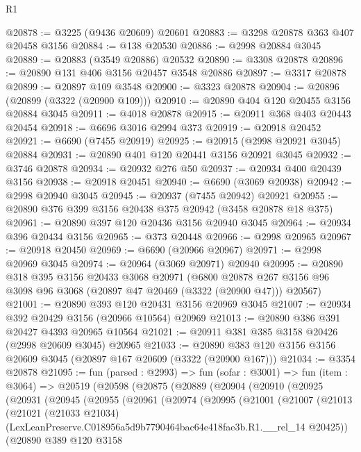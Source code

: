 \begin{lexlean}{R1}
\begin{coremodule}
@20878 := @3225 (@9436 @20609) @20601
@20883 := @3298 @20878 @363 @407 @20458 @3156
@20884 := @138 @20530
@20886 := @2998 @20884 @3045
@20889 := @20883 (@3549 @20886) @20532
@20890 := @3308 @20878
@20896 := @20890 @131 @406 @3156 @20457 @3548 @20886
@20897 := @3317 @20878
@20899 := @20897 @109 @3548
@20900 := @3323 @20878
@20904 := @20896 (@20899 (@3322 (@20900 @109)))
@20910 := @20890 @404 @120 @20455 @3156 @20884 @3045
@20911 := @4018 @20878
@20915 := @20911 @368 @403 @20443 @20454
@20918 := @6696 @3016 @2994 @373
@20919 := @20918 @20452
@20921 := @6690 (@7455 @20919)
@20925 := @20915 (@2998 @20921 @3045) @20884
@20931 := @20890 @401 @120 @20441 @3156 @20921 @3045
@20932 := @3746 @20878
@20934 := @20932 @276 @50
@20937 := @20934 @400 @20439 @3156
@20938 := @20918 @20451
@20940 := @6690 (@3069 @20938)
@20942 := @2998 @20940 @3045
@20945 := @20937 (@7455 @20942) @20921
@20955 := @20890 @376 @399 @3156 @20438 @375 @20942 (@3458 @20878 @18 @375)
@20961 := @20890 @397 @120 @20436 @3156 @20940 @3045
@20964 := @20934 @396 @20434 @3156
@20965 := @373 @20448
@20966 := @2998 @20965
@20967 := @20918 @20450
@20969 := @6690 (@20966 @20967)
@20971 := @2998 @20969 @3045
@20974 := @20964 (@3069 @20971) @20940
@20995 := @20890
    @318
    @395
    @3156
    @20433
    @3068
    @20971
    (@6800 @20878 @267 @3156 @96 @3098 @96 @3068 (@20897 @47 @20469 (@3322 (@20900 @47))) @20567)
@21001 := @20890 @393 @120 @20431 @3156 @20969 @3045
@21007 := @20934 @392 @20429 @3156 (@20966 @10564) @20969
@21013 := @20890 @386 @391 @20427 @4393 @20965 @10564
@21021 := @20911 @381 @385 @3158 @20426 (@2998 @20609 @3045) @20965
@21033 := @20890 @383 @120 @3156 @3156 @20609 @3045 (@20897 @167 @20609 (@3322 (@20900 @167)))
@21034 := @3354 @20878
@21095 := fun (parsed : @2993) =>
  fun (sofar : @3001) =>
  fun (item : @3064) =>
  @20519
    (@20598
      (@20875
        (@20889
          (@20904
            (@20910
              (@20925
                (@20931
                  (@20945
                    (@20955
                      (@20961
                        (@20974
                          (@20995
                            (@21001
                              (@21007
                                (@21013
                                  (@21021
                                    (@21033 @21034)
                                    (LexLeanPreserve.C018956a5d9b7790464bac64e418fae3b.R1.__rel_14
                                      @20425))
                                  (@20890
                                    @389
                                    @120
                                    @3158

\end{coremodule}
\end{lexlean}
